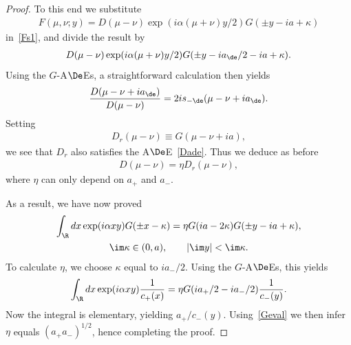 \begin{proof}
To this end we substitute
\begin{gather}
F(\mu,\nu;y)=D(\mu-\nu)\exp(i\alpha (\mu+\nu)y/2)G(\pm y-ia+\kappa)
\end{gather}
in~\eqref{Fs1}, and divide the result by
\begin{gather}
D(\mu-\nu)\exp(i\alpha (\mu+\nu)y/2)G(\pm y-ia_{\de}/2-ia+\kappa).
\end{gather}
Using the $G$-A$\De$Es, a straightforward calculation then yields
\begin{gather}\label{Dade}
\frac{D(\mu-\nu+ia_{\de})}{D(\mu-\nu)}=2is_{-\de}(\mu-\nu+ia_{\de}).
\end{gather}
Setting
\begin{gather}
D_r(\mu-\nu)\equiv G(\mu-\nu+ia),
\end{gather}
we see that $D_r$ also satisf\/ies the A$\De$E~\eqref{Dade}. Thus we deduce as before
\begin{gather}
D(\mu-\nu)=\eta D_r(\mu-\nu),
\end{gather}
where $\eta$ can only depend on $a_{+}$ and $a_{-}$.

As a result, we have now proved
\begin{gather}\label{Ftr}
\int_{\R}dx\exp(i\alpha xy)G(\pm x-\kappa)=\eta G(ia-2\kappa)G(\pm y-ia+\kappa),\\
 \im \kappa \in (0,a),\qquad |\im y|<\im \kappa.\nonumber
\end{gather}
To calculate $\eta$, we choose $\kappa$ equal to $ia_{-}/2$. Using the $G$-A$\De$Es, this yields
\begin{gather}
\int_{\R}dx\exp(i\alpha xy)\frac{1}{c_{+}(x)}=\eta G(ia_{+}/2-ia_{-}/2)\frac{1}{c_{-}(y)}.
\end{gather}
Now the integral is elementary, yielding $a_{+}/c_{-}(y)$. Using~\eqref{Geval} we then infer $\eta$ equals $(a_{+}a_{-})^{1/2}$, hence completing the proof.
\end{proof}
